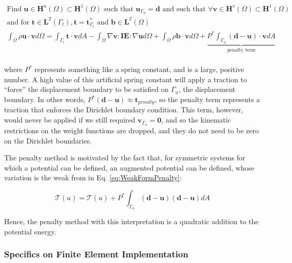 \documentclass[10pt]{article}
\begin{document}
\begin{equation}
\label{eq:WeakFormPenalty}
\begin{aligned}
\text{Find }\textbf{u}\in \textbf{H}^u(\Omega)\subset \textbf{H}^1(\Omega) \text{ such that } \textbf{u}_{\Gamma_u}=\textbf{d} \text{ and such that }\forall\textbf{v} \in \textbf{H}^v(\Omega)\subset \textbf{H}^1(\Omega)\\
\text{and for }\textbf{t}\in\textbf{L}^2(\Gamma_t), \textbf{t}=\textbf{t}^{*}_{\Gamma_t}\text{ and }\textbf{b}\in\textbf{L}^2(\Omega)\\
\int_{\Omega}\rho\ddot{\textbf{u}}\cdot \textbf{v}d\Omega=\int_{\Gamma_t}\textbf{t}\cdot\textbf{v}dA- \int_{\Omega}\nabla\textbf{v}:\textbf{IE}:\nabla\textbf{u}d\Omega +\int_{\Omega}\rho\textbf{b}\cdot\textbf{v}d\Omega+\underbrace{P^{*}\int_{\Gamma_u}(\textbf{d}-\textbf{u})\cdot\textbf{v}dA}_\text{penalty term}\\
\end{aligned}
\end{equation}

where \(P^{*}\) represents something like a spring constant, and is a large, positive number. A high value of this artificial spring constant will apply a traction to ``force'' the displacement boundary to be satisfied on \(\Gamma_u\), the displacement boundary. In other words, \(P^{*}(\textbf{d}-\textbf{u})\approx\textbf{t}_{penalty}\), so the penalty term represents a traction that enforces the Dirichlet boundary condition. This term, however, would never be applied if we still required \(\textbf{v}_{\Gamma_u}=\textbf{0}\), and so the kinematic restrictions on the weight functions are dropped, and they do not need to be zero on the Dirichlet boundaries.

The penalty method is motivated by the fact that, for symmetric systems for which a potential can be defined, an augmented potential can be defined, whose variation is the weak from in Eq. \eqref{eq:WeakFormPenalty}:

\begin{equation}
\mathscr{T}(u)=\mathscr{T}(u)+P^{*}\int_{\Gamma_u}(\textbf{d}-\textbf{u})(\textbf{d}-\textbf{u})dA
\end{equation}

Hence, the penalty method with this interpretation is a quadratic addition to the potential energy. 

\subsubsection{Specifics on Finite Element Implementation}
\end{document}
